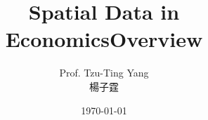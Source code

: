 \documentclass[dvipsnames,hyperref={pdfpagelabels=false}]{beamer}
\title[]  
{Spatial Data in Economics}
\author 
{Prof. Tzu-Ting Yang  \\ 楊子霆}
\institute{Institute of Economics, Academia Sinica  \\ 中央研究院經濟研究所}
\date
{\today}
\begin{document}
	
	
	\begin{frame}{}
	\titlepage
\end{frame}






\title[]  
{Overview}


\author 
{}

\institute{}






\date
{}


\begin{frame}{}
	\titlepage
\end{frame}





\end{document}
